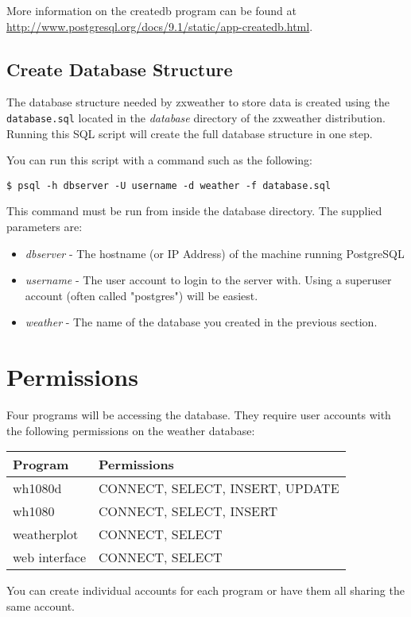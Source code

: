 \documentclass[a4paper,10pt,draft]{book}
\begin{document}
More information on the createdb program can be found at \url{http://www.postgresql.org/docs/9.1/static/app-createdb.html}.

\subsection{Create Database Structure}
The database structure needed by zxweather to store data is created using the \verb|database.sql| located in the \emph{database} directory of the zxweather distribution. Running this SQL script will create the full database structure in one step.

You can run this script with a command such as the following:
\begin{verbatim}
$ psql -h dbserver -U username -d weather -f database.sql 
\end{verbatim}
This command must be run from inside the database directory. The supplied parameters are:
\begin{itemize}
\item \emph{dbserver} - The hostname (or IP Address) of the machine running PostgreSQL
\item \emph{username} - The user account to login to the server with. Using a superuser account (often called "postgres") will be easiest.
\item \emph{weather} - The name of the database you created in the previous section.
\end{itemize}

\section{Permissions}
Four programs will be accessing the database. They require user accounts with the following permissions on the weather database:

\begin{tabular}{l l}
\hline
\textbf{Program} & \textbf{Permissions} \\
\hline
wh1080d & CONNECT, SELECT, INSERT, UPDATE \\
wh1080 & CONNECT, SELECT, INSERT \\
weatherplot & CONNECT, SELECT \\
web interface & CONNECT, SELECT \\
\hline
\end{tabular}

You can create individual accounts for each program or have them all sharing the same account.
\end{document}
